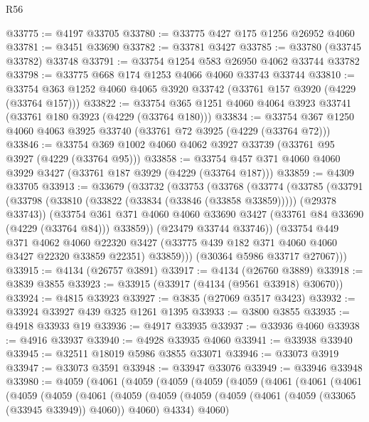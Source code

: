\begin{lexlean}{R56}
\begin{coremodule}
@33775 := @4197 @33705
@33780 := @33775 @427 @175 @1256 @26952 @4060
@33781 := @3451 @33690
@33782 := @33781 @3427
@33785 := @33780 (@33745 @33782) @33748
@33791 := @33754 @1254 @583 @26950 @4062 @33744 @33782
@33798 := @33775 @668 @174 @1253 @4066 @4060 @33743 @33744
@33810 := @33754 @363 @1252 @4060 @4065 @3920 @33742 (@33761 @157 @3920 (@4229 (@33764 @157)))
@33822 := @33754 @365 @1251 @4060 @4064 @3923 @33741 (@33761 @180 @3923 (@4229 (@33764 @180)))
@33834 := @33754 @367 @1250 @4060 @4063 @3925 @33740 (@33761 @72 @3925 (@4229 (@33764 @72)))
@33846 := @33754 @369 @1002 @4060 @4062 @3927 @33739 (@33761 @95 @3927 (@4229 (@33764 @95)))
@33858 := @33754 @457 @371 @4060 @4060 @3929 @3427 (@33761 @187 @3929 (@4229 (@33764 @187)))
@33859 := @4309 @33705
@33913 := @33679
    (@33732
      (@33753
        (@33768
          (@33774
            (@33785
              (@33791
                (@33798 (@33810 (@33822 (@33834 (@33846 (@33858 @33859))))) (@29378 @33743))
                (@33754
                  @361
                  @371
                  @4060
                  @4060
                  @33690
                  @3427
                  (@33761 @84 @33690 (@4229 (@33764 @84)))
                  @33859))
              (@23479 @33744 @33746))
            (@33754
              @449
              @371
              @4062
              @4060
              @22320
              @3427
              (@33775 @439 @182 @371 @4060 @4060 @3427 @22320 @33859 @22351)
              @33859)))
        (@30364 @5986 @33717 @27067)))
@33915 := @4134 (@26757 @3891)
@33917 := @4134 (@26760 @3889)
@33918 := @3839 @3855
@33923 := @33915 (@33917 (@4134 (@9561 @33918) @30670))
@33924 := @4815 @33923
@33927 := @3835 (@27069 @3517 @3423)
@33932 := @33924 @33927 @439 @325 @1261 @1395
@33933 := @3800 @3855
@33935 := @4918 @33933 @19
@33936 := @4917 @33935
@33937 := @33936 @4060
@33938 := @4916 @33937
@33940 := @4928 @33935 @4060
@33941 := @33938 @33940
@33945 := @32511 @18019 @5986 @3855 @33071
@33946 := @33073 @3919
@33947 := @33073 @3591
@33948 := @33947 @33076
@33949 := @33946 @33948
@33980 := @4059
    (@4061
      (@4059
        (@4059
          (@4059
            (@4059
              (@4061
                (@4061
                  (@4061
                    (@4059
                      (@4059
                        (@4061
                          (@4059
                            (@4059
                              (@4059
                                (@4059 (@4061 (@4059 (@33065 (@33945 @33949)) @4060)) @4060)
                                @4334)
                              @4060)

\end{coremodule}
\end{lexlean}

